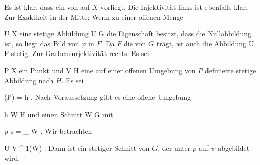 {





Es ist klar, dass ein
von
auf $X$ vorliegt. Die Injektivität links ist ebenfalls klar. Zur Exaktheit in der Mitte: Wenn zu einer offenen Menge

\mavergleichskette
{\vergleichskette
{U
}
{ \subseteq }{ X
}
{  }{
}
{    }{
}
{   }{
}
}
{}{}{}
eine stetige Abbildung
\maabb {\varphi} { U } { G
} {}
die Eigenschaft besitzt, dass
 die Nullabbildung ist, so liegt das Bild von $\varphi$ in $F$. Da $F$ die
von $G$ trägt, ist auch die Abbildung
\maabb {\varphi} { U } { F
} {}
stetig. Zur Garbensurjektivität rechts: Es sei

\mavergleichskette
{\vergleichskette
{P
}
{ \in }{ X
}
{  }{
}
{    }{
}
{   }{
}
}
{}{}{}
ein Punkt und
\maabbdisp {\psi} { V} {H
} {}
eine auf einer offenen Umgebung von $P$ definierte stetige Abbildung nach $H$. Es sei

\mavergleichskette
{\vergleichskette
{ \psi(P)
}
{ = }{ h
}
{  }{
}
{    }{
}
{   }{
}
}
{}{}{.}
Nach Voraussetzung gibt es eine offene Umgebung

\mavergleichskette
{\vergleichskette
{h
}
{ \in }{ W
}
{ \subseteq }{ H
}
{    }{
}
{   }{
}
}
{}{}{}
und einen Schnitt
 { W} {G
} {}
mit

\mavergleichskette
{\vergleichskette
{ p \circ s
}
{ = }{
_{  W  }
}
{  }{
}
{    }{
}
{   }{
}
}
{}{}{.}
Wir betrachten

\mavergleichskettedisp
{\vergleichskette
{U
}
{ } { V \cap \psi^{-1}(W)
}
{ } {
}
{ } {
}
{ } {
}
}
{}{}{.}
Dann ist
 {} {}
ein stetiger Schnitt von $G$, der unter $p$ auf $\psi$ abgebildet wird.




}





